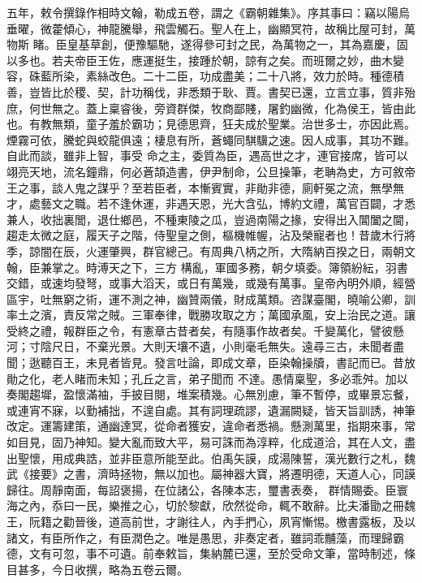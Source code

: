 \begin{pinyinscope}
 五年，敕令撰錄作相時文翰，勒成五卷，謂之《霸朝雜集》。序其事曰：竊以陽烏垂曜，微藿傾心，神龍騰舉，飛雲觸石。聖人在上，幽顯冥符，故稱比屋可封，萬物斯
 睹。臣皇基草創，便豫驅馳，遂得參可封之民，為萬物之一，其為嘉慶，固以多也。若夫帝臣王佐，應運挺生，接踵於朝，諒有之矣。而班爾之妙，曲木變容，硃藍所染，素絲改色。二十二臣，功成盡美；二十八將，效力於時。種德積善，豈皆比於稷、契，計功稱伐，非悉類于耿、賈。書契已還，立言立事，質非殆庶，何世無之。蓋上稟睿後，旁資群傑，牧商鄙賤，屠釣幽微，化為侯王，皆由此也。有教無類，童子羞於霸功；見德思齊，狂夫成於聖業。治世多士，亦因此焉。煙霧可依，騰蛇與蛟龍俱遠；棲息有所，蒼蠅同騏驥之速。因人成事，其功不難。自此而談，雖非上智，事受
 命之主，委質為臣，遇高世之才，連官接席，皆可以翊亮天地，流名鐘鼎，何必蒼頡造書，伊尹制命，公旦操筆，老聃為史，方可敘帝王之事，談人鬼之謀乎？至若臣者，本慚賓實，非勛非德，廁軒冕之流，無學無才，處藝文之職。若不逢休運，非遇天恩，光大含弘，博約文禮，萬官百闢，才悉兼人，收拙裏閭，退仕鄉邑，不種東陵之瓜，豈過南陽之掾，安得出入閶闔之閫，趨走太微之庭，履天子之階，侍聖皇之側，樞機帷幄，沾及榮寵者也！昔歲木行將季，諒闇在辰，火運肇興，群官總己。有周典八柄之所，大隋納百揆之日，兩朝文翰，臣兼掌之。時溥天之下，三方
 構亂，軍國多務，朝夕填委。簿領紛紜，羽書交錯，或速均發弩，或事大滔天，或日有萬幾，或幾有萬事。皇帝內明外順，經營區宇，吐無窮之術，運不測之神，幽贊兩儀，財成萬類。咨謀臺閣，曉喻公卿，訓率土之濱，責反常之賊。三軍奉律，戰勝攻取之方；萬國承風，安上治民之道。讓受終之禮，報群臣之令，有憲章古昔者矣，有隨事作故者矣。千變萬化，譬彼懸河；寸陰尺日，不棄光景。大則天壤不遺，小則毫毛無失。遠尋三古，未聞者盡聞；逖聽百王，未見者皆見。發言吐論，即成文章，臣染翰操牘，書記而已。昔放勛之化，老人睹而未知；孔丘之言，弟子聞而
 不達。愚情稟聖，多必乖舛。加以奏閣趨墀，盈懷滿袖，手披目閱，堆案積幾。心無別慮，筆不暫停，或畢景忘餐，或連宵不寐，以勤補拙，不遑自處。其有詞理疏謬，遺漏闕疑，皆天旨訓誘，神筆改定。運籌建策，通幽達冥，從命者獲安，違命者悉禍。懸測萬里，指期來事，常如目見，固乃神知。變大亂而致大平，易可誅而為淳粹，化成道洽，其在人文，盡出聖懷，用成典誥，並非臣意所能至此。伯禹矢謨，成湯陳誓，漢光數行之札，魏武《接要》之書，濟時拯物，無以加也。屬神器大寶，將遷明德，天道人心，同謨歸往。周靜南面，每詔褒揚，在位諸公，各陳本志，璽書表奏，
 群情賜委。臣寰海之內，忝曰一民，樂推之心，切於黎獻，欣然從命，輒不敢辭。比夫潘勖之冊魏王，阮籍之勸晉後，道高前世，才謝往人，內手捫心，夙宵慚惕。檄書露板，及以諸文，有臣所作之，有臣潤色之。唯是愚思，非奏定者，雖詞乖黼藻，而理歸霸德，文有可忽，事不可遺。前奉敕旨，集納麓已還，至於受命文筆，當時制述，條目甚多，今日收撰，略為五卷云爾。




\end{pinyinscope}
